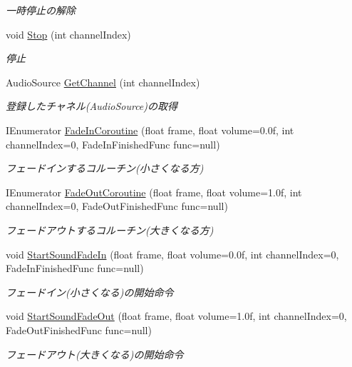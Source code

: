 \begin{DoxyCompactItemize}
\begin{DoxyCompactList}\small\item\em 一時停止の解除 \end{DoxyCompactList}\item 
void \hyperlink{class_sound_manager_a4b049d53b4fd9137a900d0b44c555a60}{Stop} (int channel\+Index)
\begin{DoxyCompactList}\small\item\em 停止 \end{DoxyCompactList}\item 
Audio\+Source \hyperlink{class_sound_manager_ae9f3da934103d1d6fa7901f3e60d5ccb}{Get\+Channel} (int channel\+Index)
\begin{DoxyCompactList}\small\item\em 登録したチャネル(\+Audio\+Source)の取得 \end{DoxyCompactList}\item 
I\+Enumerator \hyperlink{class_sound_manager_aeb06497852c55c68d829e9cd2b6c8c0c}{Fade\+In\+Coroutine} (float frame, float volume=0.\+0f, int channel\+Index=0, Fade\+In\+Finished\+Func func=null)
\begin{DoxyCompactList}\small\item\em フェードインするコルーチン(小さくなる方) \end{DoxyCompactList}\item 
I\+Enumerator \hyperlink{class_sound_manager_a835a7e59622535078cdb6e705d74a340}{Fade\+Out\+Coroutine} (float frame, float volume=1.\+0f, int channel\+Index=0, Fade\+Out\+Finished\+Func func=null)
\begin{DoxyCompactList}\small\item\em フェードアウトするコルーチン(大きくなる方) \end{DoxyCompactList}\item 
void \hyperlink{class_sound_manager_aed0690aa358d5d5c14febad7f7a14054}{Start\+Sound\+Fade\+In} (float frame, float volume=0.\+0f, int channel\+Index=0, Fade\+In\+Finished\+Func func=null)
\begin{DoxyCompactList}\small\item\em フェードイン(小さくなる)の開始命令 \end{DoxyCompactList}\item 
void \hyperlink{class_sound_manager_a008ec30f5bbbddb9268ad1bb0fc4b1b2}{Start\+Sound\+Fade\+Out} (float frame, float volume=1.\+0f, int channel\+Index=0, Fade\+Out\+Finished\+Func func=null)
\begin{DoxyCompactList}\small\item\em フェードアウト(大きくなる)の開始命令 \end{DoxyCompactList}\item 

\end{DoxyCompactItemize}

